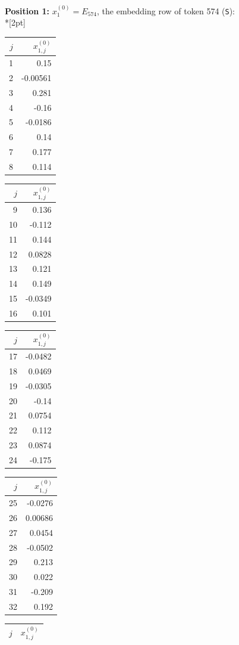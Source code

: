 \noindent \textbf{Position 1:} $x^{(0)}_{1} = E_{574}$, the embedding row of token 574 (\texttt{S}):\\*[2pt]
{\tablefont \begin{tabular}[t]{r|r}
$j$ & $x^{(0)}_{1,j}$ \\\hline
1 & 0.15 \\
2 & -0.00561 \\
3 & 0.281 \\
4 & -0.16 \\
5 & -0.0186 \\
6 & 0.14 \\
7 & 0.177 \\
8 & 0.114
\end{tabular}\kern4pt
\begin{tabular}[t]{r|r}
$j$ & $x^{(0)}_{1,j}$ \\\hline
9 & 0.136 \\
10 & -0.112 \\
11 & 0.144 \\
12 & 0.0828 \\
13 & 0.121 \\
14 & 0.149 \\
15 & -0.0349 \\
16 & 0.101
\end{tabular}\kern4pt
\begin{tabular}[t]{r|r}
$j$ & $x^{(0)}_{1,j}$ \\\hline
17 & -0.0482 \\
18 & 0.0469 \\
19 & -0.0305 \\
20 & -0.14 \\
21 & 0.0754 \\
22 & 0.112 \\
23 & 0.0874 \\
24 & -0.175
\end{tabular}\kern4pt
\begin{tabular}[t]{r|r}
$j$ & $x^{(0)}_{1,j}$ \\\hline
25 & -0.0276 \\
26 & 0.00686 \\
27 & 0.0454 \\
28 & -0.0502 \\
29 & 0.213 \\
30 & 0.022 \\
31 & -0.209 \\
32 & 0.192
\end{tabular}\kern4pt
\begin{tabular}[t]{r|r}
$j$ & $x^{(0)}_{1,j}$ \\\hline

\end{tabular}}
